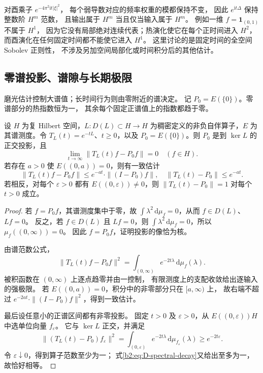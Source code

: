 对酉乘子 \(e^{-4\pi^2\mathrm it|\xi|^2}\)，
每个弱导数对应的频率权重的模都保持不变，
因此 \(e^{\mathrm it\Delta}\) 保持整数阶 \(H^m\) 范数，
且输出属于 \(H^m\) 当且仅当输入属于 \(H^m\)。
例如一维 \(f=\mathbf1_{(0,1)}\) 不属于 \(H^1\)，
因为它没有局部绝对连续代表；热演化使它在每个正时间进入 \(H^2\)，
而酉演化在任何固定时间都不能使它进入 \(H^1\)。
这里讨论的是固定时间的全空间 Sobolev 正则性，
不涉及另加空间局部化或时间积分后的其他估计。

\subsection{零谱投影、谱隙与长期极限}
\label{b2:subsec:D-spectral-longtime}

磨光估计控制大谱值；长时间行为则由零附近的谱决定。
记 \(P_0=E(\{0\})\)。零谱部分的热指数恒为一，
其余每个固定正谱值上的指数都趋于零。

\begin{proposition}[热演化的长期极限]\label{b2:prop:D-spectral-longtime}
设 \(H\) 为复 Hilbert 空间，\(L:D(L)\subset H\to H\) 为稠密定义的非负自伴算子，\(E\) 为其谱测度。令 \(T_L(t)=e^{-tL}\)、\(t\ge0\)，以及 \(P_0=E(\{0\})\)。则 \(P_0\) 是到 \(\ker L\) 的正交投影，且
\[
 \lim_{t\to\infty}\|T_L(t)f-P_0f\|=0
 \quad(f\in H).
\]
若存在 \(a>0\) 使 \(E((0,a))=0\)，则有一致估计
\[
 \|T_L(t)f-P_0f\|\le e^{-at}\cdot\|(I-P_0)f\|,
 \quad \|T_L(t)-P_0\|\le e^{-at}.
\]
若相反，对每个 \(\varepsilon>0\) 都有 \(E((0,\varepsilon))\ne0\)，则
\(\|T_L(t)-P_0\|=1\) 对每个 \(t>0\) 成立。
\end{proposition}
\begin{proof}
若 \(f=P_0f\)，其谱测度集中于零，故
\(\int\lambda^2\,\mathrm d\mu_f=0\)，从而 \(f\in D(L)\)、\(Lf=0\)。
反之，若 \(f\in D(L)\) 且 \(Lf=0\)，则
\(\int\lambda^2\,\mathrm d\mu_f=0\)，所以 \(\mu_f((0,\infty))=0\)。
因此 \(f=P_0f\)，证明投影的像恰为核。

由谱范数公式，
\begin{equation}\label{b2:eq:D-spectral-decay}
 \|T_L(t)f-P_0f\|^2
 =\int_{(0,\infty)}e^{-2t\lambda}\,\mathrm d\mu_f(\lambda).
\end{equation}
被积函数在 \((0,\infty)\) 上逐点趋零并由一控制，
有限测度上的支配收敛给出逐输入的强极限。
若 \(E((0,a))=0\)，积分中的非零部分只在 \([a,\infty)\) 上，
故右端不超过 \(e^{-2at}\cdot\|(I-P_0)f\|^2\)，得到一致估计。

最后设任意小的正谱区间都有非零投影。
固定 \(t>0\) 及 \(\varepsilon>0\)，从
\(E((0,\varepsilon))H\) 中选单位向量 \(f_\varepsilon\)。
它与 \(\ker L\) 正交，并满足
\[
 \|(T_L(t)-P_0)f_\varepsilon\|^2
 =\int_{(0,\varepsilon)}e^{-2t\lambda}\,
                      \mathrm d\mu_{f_\varepsilon}(\lambda)
 \ge e^{-2t\varepsilon}.
\]
令 \(\varepsilon\downarrow0\)，得到算子范数至少为一；
式\eqref{b2:eq:D-spectral-decay}又给出至多为一，故恰好相等。
\end{proof}

